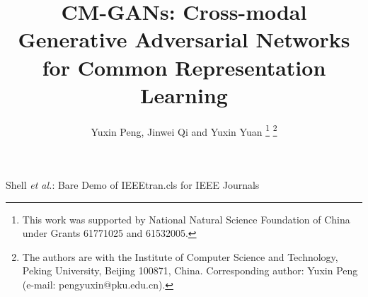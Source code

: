 \documentclass[journal]{IEEEtran}
\begin{document}
\title{CM-GANs: Cross-modal Generative Adversarial Networks for Common Representation Learning}

\author{Yuxin Peng, Jinwei Qi and Yuxin Yuan
	\thanks{This work was supported by National Natural Science Foundation of China under Grants 61771025 and 61532005.}
	\thanks{The authors are with the Institute of Computer Science and Technology,	Peking University, Beijing 100871, China. Corresponding author: Yuxin Peng	(e-mail: pengyuxin@pku.edu.cn).}
}



%
{Shell \MakeLowercase{\textit{et al.}}: Bare Demo of IEEEtran.cls for IEEE Journals}











\maketitle
\end{document}
